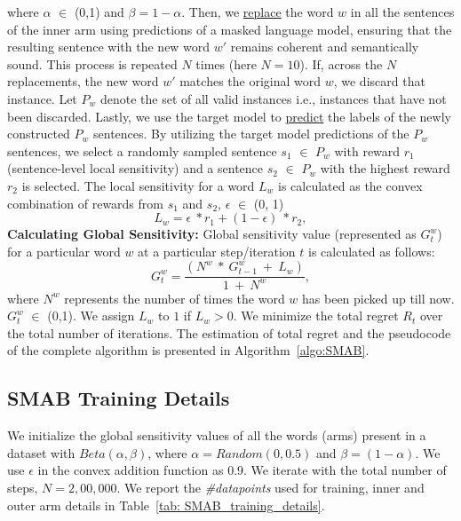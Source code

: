 where $\alpha$ $\in$ (0,1) and $\beta = 1-\alpha$. Then, we  \underline{replace} the word $w$ in all the sentences of the inner arm using predictions of a masked language model, ensuring that the resulting sentence with the new word $w'$ remains coherent and semantically sound. This process is repeated $N$ times (here $N=10$). If, across the $N$ replacements, the new word $w'$ matches the original word $w$, we discard that instance. Let $P_w$ denote the set of all valid instances i.e., instances that have not been discarded. Lastly, we use the target model to \underline{predict} the labels of the newly constructed ${P}_w$ sentences. By utilizing the target model predictions of the ${P}_w$ sentences, we select a randomly sampled sentence $s_1$ $\in$ $P_w$ with reward $r_1$ (sentence-level local sensitivity) and a sentence $s_2$ $\in$ $P_w$ with the highest reward $r_2$ is selected. The local sensitivity for a word $L_w$ is calculated as the convex combination of rewards from $s_1$ and $s_2$,  $\epsilon$ \(\in\) (0, 1) \begin{equation}
    L_w = \epsilon\:*r_1 + (1-\epsilon)\:*r_2,
\end{equation} 
\textbf{Calculating Global Sensitivity:} Global sensitivity value (represented as $G^{w}_{t}$) for a particular word $w$ at a particular step/iteration $t$ is calculated as follows: \begin{equation}
    G^{w}_{t} = \frac{(N^w\:*\:G^{w}_{t - 1}\: + \: L_{w})}{ 1 \:+ \:N^w},
\end{equation}
where $N^w$ represents the number of times the word $w$ has been picked up till now. $G^{w}_{t}$ \(\in\) (0,1). We assign $L_{w}$ to $1$ if $L_{w}>0$. We minimize the total regret $R_t$ over the total number of iterations. The estimation of total regret and the pseudocode of the complete algorithm is presented in Algorithm~\ref{algo:SMAB}.

\subsection{SMAB Training Details}
We initialize the global sensitivity values of all the words (arms) present in a dataset with $Beta(\alpha, \beta)$, where $\alpha = Random(0,0.5)$ and $\beta = (1 - \alpha)$. We use $\epsilon$ in the convex addition function as 0.9. We iterate with the total number of steps, $N = 2,00,000$. We report the  \textit{\#datapoints} used for training, inner and outer arm details in Table~\ref{tab: SMAB_training_details}. 
